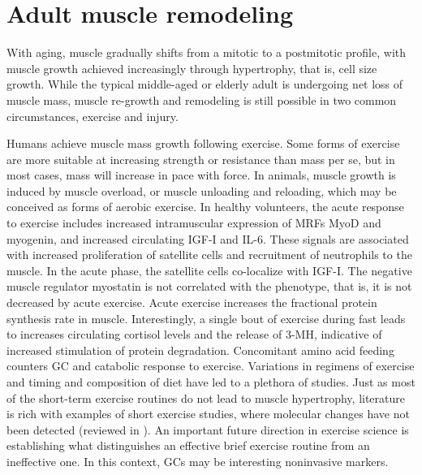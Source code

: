 \documentclass[12pt,english]{report}\usepackage[]{graphicx}\usepackage[]{color}
\begin{document}
\section{Adult muscle remodeling}

With aging, muscle gradually shifts from a mitotic to a postmitotic
profile, with muscle growth achieved increasingly through hypertrophy,
that is, cell size growth. While the typical middle-aged or elderly
adult is undergoing net loss of muscle mass, muscle re-growth and
remodeling is still possible in two common circumstances, exercise
and injury.

Humans achieve muscle mass growth following exercise. Some forms of
exercise are more suitable at increasing strength or resistance than
mass per se, but in most cases, mass will increase in pace with force.
In animals, muscle growth is induced by muscle overload, or muscle
unloading and reloading, which may be conceived as forms of aerobic
exercise. In healthy volunteers, the acute response to exercise includes
increased intramuscular expression of MRFs MyoD and myogenin, and
increased circulating IGF-I and IL-6\citep{grubb2014igf-1,ullum1994bicycle,bickel2005time}.
These signals are associated with increased proliferation of satellite
cells and recruitment of neutrophils to the muscle\citep{fielding1993acute,snijders2014acute}.
In the acute phase, the satellite cells co-localize with IGF-I\citep{grubb2014igf-1}.
The negative muscle regulator myostatin is not correlated with the
phenotype, that is, it is not decreased by acute exercise\citep{snijders2014acute,schiffer2011mstn}.
Acute exercise increases the fractional protein synthesis rate in
muscle\citep{dreyer2010resistance,harber2010muscle}. Interestingly,
a single bout of exercise during fast leads to increases circulating
cortisol levels and the release of 3-MH, indicative of increased stimulation
of protein degradation\citep{bird2006liquid}. Concomitant amino acid
feeding counters GC and catabolic response to exercise. Variations
in regimens of exercise and timing and composition of diet have led
to a plethora of studies. Just as most of the short-term exercise
routines do not lead to muscle hypertrophy, literature is rich with
examples of short exercise studies, where molecular changes have not
been detected (reviewed in \citep{vanloon2014there}). An important
future direction in exercise science is establishing what distinguishes
an effective brief exercise routine from an ineffective one. In this
context, GCs may be interesting noninvasive markers.
\end{document}
